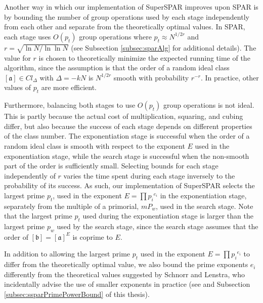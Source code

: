 \documentclass{ucalgthes1}
\theoremstyle{definition}
\newcommand{\ideal}{\mathfrak}
\newcommand{\idealclass}[1]{\left[ \ideal #1 \right]}
\newcommand{\aclass}{\idealclass a}
\newcommand{\bclass}{\idealclass b}
\begin{document}
Another way in which our implementation of SuperSPAR improves upon SPAR is by bounding the number of group operations used by each stage independently from each other and separate from the theoretically optimal values.  In SPAR, each stage uses $O(p_t)$ group operations where $p_t \approx N^{1/2r}$ and $r = \sqrt{\ln N / \ln \ln N}$ (see Subsection \ref{subsec:sparAlg} for additional details).  The value for $r$ is chosen to theoretically minimize the expected running time of the algorithm, since the assumption is that the order of a random ideal class $\aclass \in Cl_\Delta$ with $\Delta = -kN$ is $N^{1/2r}$ smooth with probability $r^{-r}$.  In practice, other values of $p_t$ are more efficient.  

Furthermore, balancing both stages to use $O(p_t)$ group operations is not ideal.  This is partly because the actual cost of multiplication, squaring, and cubing differ, but also because the success of each stage depends on different properties of the class number.  The exponentiation stage is successful when the order of a random ideal class is smooth with respect to the exponent $E$ used in the exponentiation stage, while the search stage is successful when the non-smooth part of the order is sufficiently small.  Selecting bounds for each stage independently of $r$ varies the time spent during each stage inversely to the probability of its success.  As such, our implementation of SuperSPAR selects the largest prime $p_t$, used in the exponent $E = \prod {p_i}^{e_i}$ in the exponentiation stage, separately from the multiple of a primorial, $mP_w$, used in the search stage.  Note that the largest prime $p_t$ used during the exponentiation stage is larger than the largest prime $p_w$ used by the search stage, since the search stage assumes that the order of $\bclass = \aclass^E$ is coprime to $E$.

In addition to allowing the largest prime $p_t$ used in the exponent $E = \prod {p_i}^{e_i}$ to differ from the theoretically optimal value, we also bound the prime exponents $e_i$ differently from the theoretical values suggested by Schnorr and Lenstra, who incidentally advise the use of smaller exponents in practice (see \cite[p.293]{Schnorr1984} and Subsection \ref{subsec:ssparPrimePowerBound} of this thesis).
\end{document}
